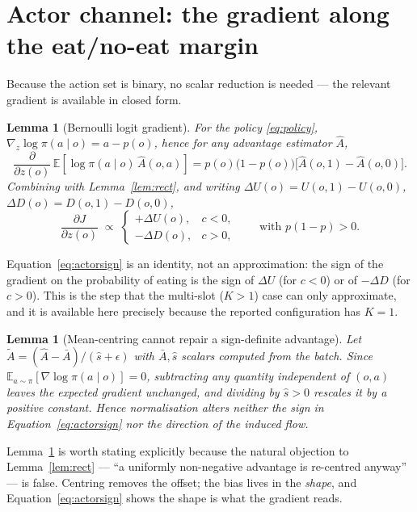 \documentclass[11pt]{article}
\newtheorem{lemma}[theorem]{Lemma}
\theoremstyle{definition}
\newcommand{\Ahat}{\hat A}
\newcommand{\E}{\mathbb{E}}
\begin{document}
\section{Actor channel: the gradient along the eat/no-eat margin}
\label{sec:actor}

Because the action set is binary, no scalar reduction is needed --- the
relevant gradient is available in closed form.

\begin{lemma}[Bernoulli logit gradient]
\label{lem:bern}
For the policy \eqref{eq:policy}, $\nabla_{z}\log\pi(a\mid o)=a-p(o)$, hence
for any advantage estimator $\Ahat$,
\begin{equation}
\frac{\partial}{\partial z(o)}\,\E\!\left[\log\pi(a\mid o)\,\Ahat(o,a)\right]
=p(o)\big(1-p(o)\big)\Big[\Ahat(o,1)-\Ahat(o,0)\Big].
\label{eq:logitgrad}
\end{equation}
Combining with Lemma~\ref{lem:rect}, and writing
$\Delta U(o)=U(o,1)-U(o,0)$, $\Delta D(o)=D(o,1)-D(o,0)$,
\begin{equation}
\frac{\partial J}{\partial z(o)}
\;\propto\;
\begin{cases}
+\Delta U(o), & c<0,\\[2pt]
-\Delta D(o), & c>0,
\end{cases}
\qquad\text{with }p(1-p)>0 .
\label{eq:actorsign}
\end{equation}
\end{lemma}

\noindent
Equation~\eqref{eq:actorsign} is an identity, not an approximation: the sign
of the gradient on the probability of eating is the sign of $\Delta U$ (for
$c<0$) or of $-\Delta D$ (for $c>0$). This is the step that the multi-slot
($K>1$) case can only approximate, and it is available here precisely because
the reported configuration has $K=1$.

\begin{lemma}[Mean-centring cannot repair a sign-definite advantage]
\label{lem:center}
Let $\tilde A=(\Ahat-\bar A)/(\hat s+\epsilon)$ with $\bar A,\hat s$ scalars
computed from the batch. Since $\E_{a\sim\pi}\!\left[\nabla\log\pi(a\mid o)\right]=0$,
subtracting any quantity independent of $(o,a)$ leaves the expected gradient
unchanged, and dividing by $\hat s>0$ rescales it by a positive constant.
Hence normalisation alters neither the sign in
Equation~\eqref{eq:actorsign} nor the direction of the induced flow.
\end{lemma}

\noindent
Lemma~\ref{lem:center} is worth stating explicitly because the natural
objection to Lemma~\ref{lem:rect} --- ``a uniformly non-negative advantage is
re-centred anyway'' --- is false. Centring removes the offset; the bias lives
in the \emph{shape}, and Equation~\eqref{eq:actorsign} shows the shape is what
the gradient reads.
\end{document}
